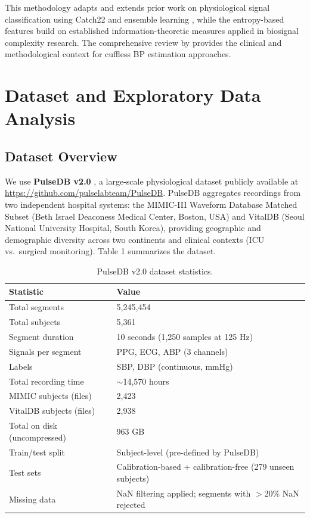 \documentclass[11pt]{article}
\begin{document}
This methodology adapts and extends prior work on physiological signal classification using Catch22 and ensemble learning \citep{boda2025ai4pain}, while the entropy-based features build on established information-theoretic measures applied in biosignal complexity research. The comprehensive review by \citet{zhao2023cuffless} provides the clinical and methodological context for cuffless BP estimation approaches.

\section{Dataset and Exploratory Data Analysis}

\subsection{Dataset Overview}

We use \textbf{PulseDB v2.0} \citep{wang2023pulsedb}, a large-scale physiological dataset publicly available at \url{https://github.com/pulselabteam/PulseDB}. PulseDB aggregates recordings from two independent hospital systems: the MIMIC-III Waveform Database Matched Subset (Beth Israel Deaconess Medical Center, Boston, USA) and VitalDB (Seoul National University Hospital, South Korea), providing geographic and demographic diversity across two continents and clinical contexts (ICU vs.\ surgical monitoring). Table 1 summarizes the dataset.

\begin{table}[ht!]
\centering
\begin{tabular}{@{}ll@{}}
\toprule
\textbf{Statistic} & \textbf{Value} \\
\midrule
Total segments & 5,245,454 \\
Total subjects & 5,361 \\
Segment duration & 10 seconds (1,250 samples at 125 Hz) \\
Signals per segment & PPG, ECG, ABP (3 channels) \\
Labels & SBP, DBP (continuous, mmHg) \\
Total recording time & $\sim$14,570 hours \\
MIMIC subjects (files) & 2,423 \\
VitalDB subjects (files) & 2,938 \\
Total on disk (uncompressed) & 963 GB \\
Train/test split & Subject-level (pre-defined by PulseDB) \\
Test sets & Calibration-based + calibration-free (279 unseen subjects) \\
Missing data & NaN filtering applied; segments with $>$20\% NaN rejected \\
\bottomrule
\end{tabular}
\caption{PulseDB v2.0 dataset statistics.}
\end{table}
\end{document}
